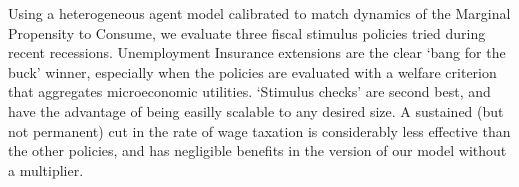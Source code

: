Using a heterogeneous agent model calibrated to match dynamics of the Marginal Propensity to Consume, we evaluate three fiscal stimulus policies tried during recent recessions.  Unemployment Insurance extensions are the clear `bang for the buck' winner, especially when the policies are evaluated with a welfare criterion that aggregates microeconomic utilities.  `Stimulus checks' are second best, and have the advantage of being easilly scalable to any desired size.  A sustained (but not permanent) cut in the rate of wage taxation is considerably less effective than the other policies, and has negligible benefits in the version of our model without a multiplier.

